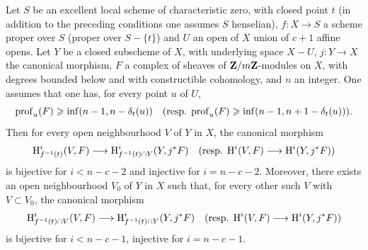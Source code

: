 \begin{proposition} \label{XIV.4.9}
Let $S$ be an excellent local scheme of characteristic zero, with closed point $t$ (\resp in addition to the preceding conditions one assumes $S$ henselian), $f\colon X\to S$ a scheme proper over $S$ (\resp proper over $S-\{ t\}$) and $U$ an open of $X$ union of $c+1$ affine opens. Let $Y$ be a closed subscheme of $X$, with underlying space $X-U$, $j\colon Y\to X$ the canonical morphism, $F$ a complex of sheaves of $\mathbf{Z}/m\mathbf{Z}$-modules on $X$, with degrees bounded below and with constructible cohomology, and $n$ an integer. One assumes that one has, for every point $u$ of $U$,
$$
\operatorname{prof}_{u}(F)\geqslant\inf(n-1, n-\delta_{t}(u))\quad(\textrm{resp.}\;\operatorname{prof}_{u}(F)\geqslant\inf(n-1, n+1-\delta_{t}(u))).
$$
Then for every open neighbourhood $V$ of $Y$ in $X$, the canonical morphism
$$
\H_{f^{-1}(t)}^{i}(V, F)\to\H_{f^{-1}(t)\cap Y}^{i}(Y, j^{\ast}F)\quad(\textrm{\resp }\;\H^{i}(V, F)\to\H^{i}(Y, j^{\ast}F))$$
is bijective for $i<n-c-2$ and injective for $i=n-c-2$. Moreover, there exists an open neighbourhood $V_{0}$ of $Y$ in $X$ such that, for every other such $V$ with $V\subset V_{0}$, the canonical morphism
$$
\H_{f^{-1}(t)\cap V}^{i}(V, F)\to\H_{f^{-1}(t)\cap Y}^{i}(Y, j^{\ast}F)\quad(\textrm{\resp }\;\H^{i}(V, F)\to\H^{i}(Y, j^{\ast}F))$$
is bijective for $i<n-c-1$, injective for $i=n-c-1$.
\end{proposition}

